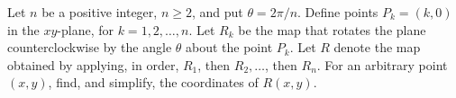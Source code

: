 Let $n$ be a positive integer, $n \ge
2$, and put  $\theta = 2 \pi / n$.
Define points $P_k = (k,0)$ in the $xy$-plane, for $k = 1, 2
, \dots, n$.
Let $R_k$ be the map that rotates the plane counterclockwise by the
angle $\theta$ about the point $P_k$.  Let $R$ denote the map obtained
by applying, in order, $R_1$,  then $R_2, \dots$,
then $R_n$.
For an arbitrary point $(x,y)$, find, and simplify, the coordinates
of $R(x,y)$.

